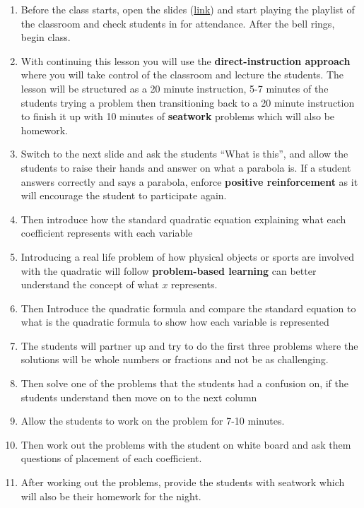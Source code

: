 \begin{enumerate}
    \item Before the class starts, open the slides (\href{https://docs.google.com/presentation/d/19ciZDfXd51fivbBudBNQqxBPUnCx569onL82jkyxO34/edit#slide=id.g29bd94fe5f5_0_6}{link}) and start playing the playlist of the classroom and check students in for attendance. After the bell rings, begin class.
    \item With continuing this lesson you will use the \textbf{direct-instruction approach} where you will take control of the classroom and lecture the students. The lesson will be structured as a 20 minute instruction, 5-7 minutes of the students trying a problem then transitioning back to a 20 minute instruction to finish it up with 10 minutes of \textbf{seatwork} problems which will also be homework.
    \item Switch to the next slide and ask the students “What is this”, and allow the students to raise their hands and answer on what a parabola is. If a student answers correctly and says a parabola, enforce \textbf{positive reinforcement} as it will encourage the student to participate again. 
    \item Then introduce how the standard quadratic equation explaining what each coefficient represents with each variable 
    \item Introducing a real life problem of how physical objects or sports are involved with the quadratic will follow \textbf{problem-based learning} can better understand the concept of what $x$ represents.
    \item Then Introduce the quadratic formula and compare the standard equation to what is the quadratic formula to show how each variable is represented 
    \item The students will partner up and try to do the first three problems where the solutions will be whole numbers or fractions and not be as challenging.
    \item Then solve one of the problems that the students had a confusion on, if the students understand then move on to the next column
    \item Allow the students to work on the problem for 7-10 minutes.
    \item Then work out the problems with the student on white board and ask them questions of placement of each coefficient.
    \item After working out the problems, provide the students with seatwork which will also be their homework for the night.
\end{enumerate}